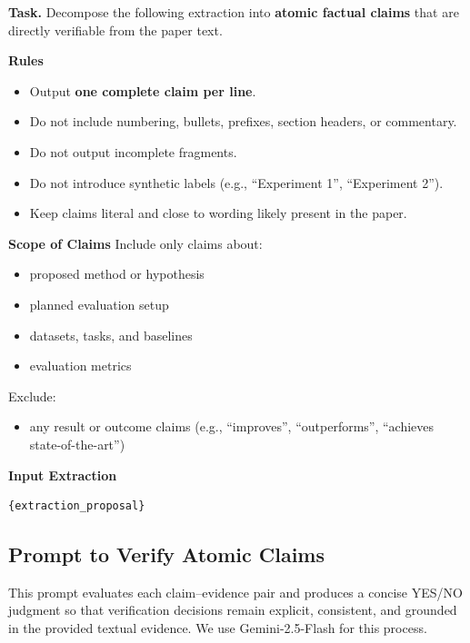 \begin{tcolorbox}[title=\textbf{User Prompt to Decompose Atomic Claims from Proposal}]
\small

\textbf{Task.} Decompose the following extraction into \textbf{atomic factual claims} that are directly verifiable from the paper text.

\vspace{0.3em}
\textbf{Rules}
\begin{itemize}
\item Output \textbf{one complete claim per line}.
\item Do not include numbering, bullets, prefixes, section headers, or commentary.
\item Do not output incomplete fragments.
\item Do not introduce synthetic labels (e.g., ``Experiment 1'', ``Experiment 2'').
\item Keep claims literal and close to wording likely present in the paper.
\end{itemize}

\vspace{0.3em}
\textbf{Scope of Claims}
Include only claims about:
\begin{itemize}
\item proposed method or hypothesis
\item planned evaluation setup
\item datasets, tasks, and baselines
\item evaluation metrics
\end{itemize}

Exclude:
\begin{itemize}
\item any result or outcome claims (e.g., ``improves'', ``outperforms'', ``achieves state-of-the-art'')
\end{itemize}

\vspace{0.3em}
\textbf{Input Extraction}
\begin{verbatim}
{extraction_proposal}
\end{verbatim}

\end{tcolorbox}

\subsection{Prompt to Verify Atomic Claims}\label{sec:supp:prompt-verify}

This prompt evaluates each claim--evidence pair and produces a concise YES/NO judgment so that verification decisions remain explicit, consistent, and grounded in the provided textual evidence. We use Gemini-2.5-Flash for this process.

